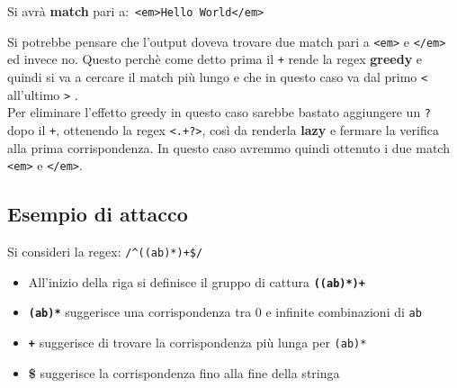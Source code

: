 Si avrà \textbf{match} pari a:\
          \verb|<em>Hello World</em>|
          
Si potrebbe pensare che l'output doveva trovare due match pari a \verb|<em>| e \verb|</em>| ed invece no. Questo perchè come detto prima il \verb|+| rende la regex \textbf{greedy} e quindi si va a cercare il match più lungo e che in questo caso va dal primo \verb|<| all'ultimo \verb|>| .\\

Per eliminare l'effetto greedy in questo caso sarebbe bastato aggiungere un \verb|?| dopo il \verb|+|, ottenendo la regex \verb|<.+?>|, così da renderla \textbf{lazy} e fermare la verifica alla prima corrispondenza. In questo caso avremmo quindi ottenuto i due match \verb|<em>| e \verb|</em>|.

\subsection{Esempio di attacco}
Si consideri la regex: \verb|/^((ab)*)+$/|
\begin{itemize}
	\item All'inizio della riga si definisce il gruppo di cattura \textbf{\texttt{((ab)*)+}}
	\item  \textbf{\texttt{(ab)*}} suggerisce una corrispondenza tra 0 e 	infinite combinazioni di \verb|ab|
	\item \textbf{\texttt{+}} suggerisce di trovare la corrispondenza più lunga per \texttt{(ab)*}
	\item \textbf{\$} suggerisce la corrispondenza fino alla fine della stringa
\end{itemize}

